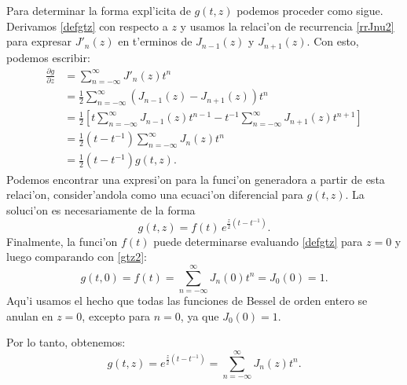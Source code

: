 Para determinar la forma expl'icita de $g(t,z)$ podemos proceder como sigue. Derivamos \eqref{defgtz} con respecto a $z$ y usamos la relaci'on de recurrencia \eqref{rrJnu2} para expresar $J'_n(z)$ en t'erminos de  $J_{n-1}(z)$ y $J_{n+1}(z)$. Con esto, podemos escribir:
\begin{align}
\frac{\partial g}{\partial z} &= \sum_{n=-\infty}^\infty J'_n(z) t^n \\
&= \frac{1}{2}\sum_{n=-\infty}^\infty \left(J_{n-1}(z)-J_{n+1}(z)\right) t^n \\
&= \frac{1}{2}\left[t\sum_{n=-\infty}^\infty J_{n-1}(z)t^{n-1}-t^{-1}\sum_{n=-\infty}^\infty J_{n+1}(z)t^{n+1} \right]\\
&= \frac{1}{2}\left(t-t^{-1}\right)\sum_{n = -\infty}^\infty J_n(z) t^n\\
&= \frac{1}{2}\left(t-t^{-1}\right)g(t,z).
\end{align}
Podemos encontrar una expresi'on para la funci'on generadora a partir de esta relaci'on, consider'andola como una ecuaci'on diferencial para $g(t,z)$. La soluci'on es necesariamente de la forma
\begin{equation}\label{gtz2}
g(t,z)=f(t)\,e^{\frac{z}{2}\left(t-t^{-1}\right)}.
\end{equation}
Finalmente, la funci'on $f(t)$ puede determinarse evaluando \eqref{defgtz} para $z=0$ y luego comparando con \eqref{gtz2}:
\begin{equation}\label{gtz3}
g(t,0)=f(t)=\sum_{n = -\infty}^\infty J_n(0) t^n=J_0(0)=1.
\end{equation}
Aqu'i usamos el hecho que todas las funciones de Bessel de orden entero se anulan en $z=0$, excepto para $n=0$, ya que $J_0(0)=1$.

Por lo tanto, obtenemos:
\begin{equation}\label{gtzJ}
\boxed{g(t,z)=e^{\frac{z}{2}\left(t-t^{-1}\right)}=\sum_{n = -\infty}^\infty J_n(z) t^n.}
\end{equation}

